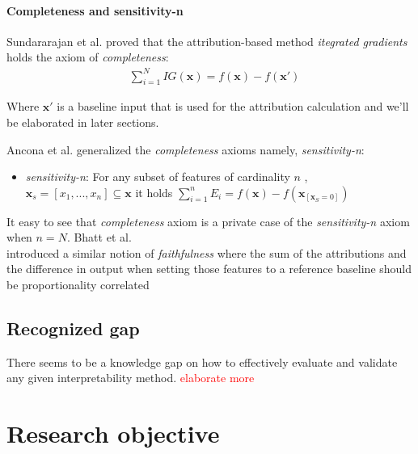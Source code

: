 \documentclass[12pt]{report}
\begin{document}
\subsubsection{Completeness and sensitivity-n}
Sundararajan et al. \cite{DBLP:journals/corr/SundararajanTY17} proved that the attribution-based method \textit{itegrated gradients} holds the axiom of \textit{completeness}:
\begin{align*}
	&\sum_{i=1}^N IG(\mathbf{x}) = f(\mathbf{x})-f(\mathbf{x}')
\end{align*}

Where $\mathbf{x}'$ is a baseline input that is used for the attribution calculation and we'll be elaborated in later sections.  

Ancona et al. \cite{https://doi.org/10.48550/arxiv.1711.06104} generalized the \textit{completeness} axioms namely, \textit{sensitivity-n}:
\begin{itemize}
	\item \textit{sensitivity-n}: For any subset of features of cardinality $n$ , $\mathbf{x}_s= [x_1, ...,x_n] \subseteq \mathbf{x} $ it holds $\sum_{i=1}^n E_i = f(\mathbf{x})- f(\mathbf{x}_{[\mathbf{x}_S =0]})$ 
\end{itemize}

It easy to see that \textit{completeness} axiom is a private case of the \textit{sensitivity-n} axiom when $n=N$. Bhatt et al. \\

\cite{DBLP:journals/corr/abs-2005-00631}  introduced a similar notion of \textit{faithfulness} where the sum of the attributions and the difference in output when setting those features to a reference baseline should be proportionality correlated

\newpage

\section{Recognized gap}

There seems to be a knowledge gap on how to effectively evaluate and validate any given interpretability method. \textcolor{red}{elaborate more }



\chapter{Research objective } 
\end{document}
